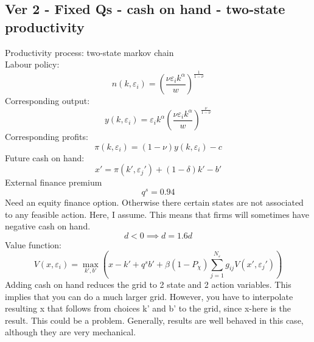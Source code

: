 \documentclass[12pt]{article}
\begin{document}
\subsection*{Ver 2 - Fixed Qs - cash on hand - two-state productivity}
Productivity process: two-state markov chain \vspace{3mm} \\
Labour policy: 
\begin{equation}
    n(k,\varepsilon_i) = \left( \dfrac{ \nu \varepsilon_i k^\alpha}{w} \right)^{\frac{1}{1-\nu}}
\end{equation}
Corresponding output: 
\begin{equation}
    y(k,\varepsilon_i) = \varepsilon_i k^{\alpha} \left( \dfrac{\nu \varepsilon_i k^\alpha}{w} \right)^{\frac{\nu}{1-\nu}}
\end{equation}
Corresponding profits: 
\begin{equation}
    \pi(k,\varepsilon_i) = (1-\nu) y(k,\varepsilon_i) - c
\end{equation}
Future cash on hand: 
\begin{equation}
   x' = \pi(k',\varepsilon_j')+(1-\delta)k'-b'
\end{equation}
External finance premium 
\begin{equation}
    q^s = 0.94
\end{equation}
Need an equity finance option. Otherwise there certain states are not associated to any feasible action. Here, I assume. This means that firms will sometimes have negative cash on hand. 
\begin{equation}
    d < 0 \implies d = 1.6d
\end{equation}
Value function:
\begin{equation}
     V(x,\varepsilon_i) = \max_{k',b'}  \left(x - k' +  q^s b' + 
            \beta  (1-P_\chi)  \sum_{j=1}^{N_\varepsilon} g_{ij} V(x',\varepsilon_j') \right)
\end{equation}
Adding cash on hand reduces the grid to 2 state and 2 action variables. This implies that you can do a much larger grid. However, you have to interpolate resulting x that follows from choices k' and b' to the grid, since x-here is the result. This could be a problem. Generally, results are well behaved in this case, although they are very mechanical. 
\end{document}
